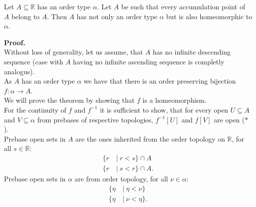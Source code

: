 \begin{lemma}\label{order_preserving_homeomorphism_theorem}
Let $A \subseteq \mathbb{R}$ has an order type $\alpha$. 
Let $A$ be such that every accumulation point of $A$ belong to $A$. Then $A$ has not only an
order type $\alpha$ but is also homeomorphic to $\alpha$. 
\end{lemma}
\textbf{Proof.} \\
Without loss of generality, let us assume, that $A$ has no infinite descending sequence 
(case with $A$ having no infinite ascending sequence is completly analogus). \\

As $A$ has an order type $\alpha$ we have that there is an order preserving bijection 
$f : \alpha \to A$. \\
We will prove the theorem by showing that $f$ is a homeomorphism. \\

For the continuity of $f$ and $f^{-1}$ it is sufficient to show, that for every open
$U \subseteq A$ and $V \subseteq \alpha$ 
from prebases of respective topologies, $f^{-1}[U]$ and $f[V]$ are open ($\ast$). \\
Prebase open sets in $A$ are the ones inherited from the order topology on $\mathbb{R}$, 
for all $s \in \mathbb{R}$:
\begin{align*}
\{r\ &|\ r<s\} \cap A\\
\{r\ &|\ s<r\} \cap A.
\end{align*}
Prebase open sets in $\alpha$ are from order topology, for all $\nu \in \alpha$:
\begin{align*}
\{\eta\ &|\ \eta<\nu\} \\
\{\eta\ &|\ \nu<\eta\}.
\end{align*} 


